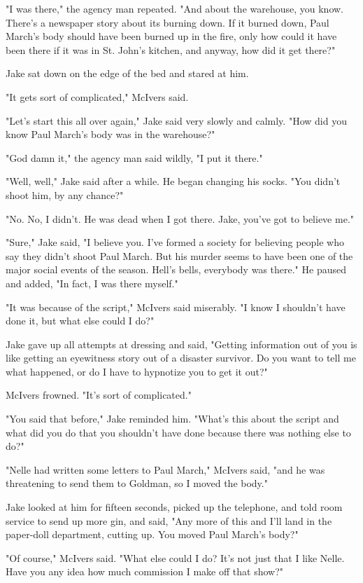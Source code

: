 \documentclass{novel}
\begin{document}
"I was there," the agency man repeated. "And about the warehouse, you know. There's a newspaper story about its burning down. If it burned down, Paul March's body should have been burned up in the fire, only how could it have been there if it was in St. John's kitchen, and anyway, how did it get there?"

Jake sat down on the edge of the bed and stared at him.

"It gets sort of complicated," McIvers said.

"Let's start this all over again," Jake said very slowly and calmly. "How did you know Paul March's body was in the warehouse?"

"God damn it," the agency man said wildly, "I put it there."

"Well, well," Jake said after a while. He began changing his socks. "You didn't shoot him, by any chance?"

"No. No, I didn't. He was dead when I got there. Jake, you've got to believe me."

"Sure," Jake said, "I believe you. I've formed a society for believing people who say they didn't shoot Paul March. But his murder seems to have been one of the major social events of the season. Hell's bells, everybody was there." He paused and added, "In fact, I was there myself."

"It was because of the script," McIvers said miserably. "I know I shouldn't have done it, but what else could I do?"

Jake gave up all attempts at dressing and said, "Getting information out of you is like getting an eyewitness story out of a disaster survivor. Do you want to tell me what happened, or do I have to hypnotize you to get it out?"

McIvers frowned. "It's sort of complicated."

"You said that before," Jake reminded him. "What's this about the script and what did you do that you shouldn't have done because there was nothing else to do?"

"Nelle had written some letters to Paul March," McIvers said, "and he was threatening to send them to Goldman, so I moved the body."

Jake looked at him for fifteen seconds, picked up the telephone, and told room service to send up more gin, and said, "Any more of this and I'll land in the paper-doll department, cutting up. You moved Paul March's body?"

"Of course," McIvers said. "What else could I do? It's not just that I like Nelle. Have you any idea how much commission I make off that show?"
\end{document}
